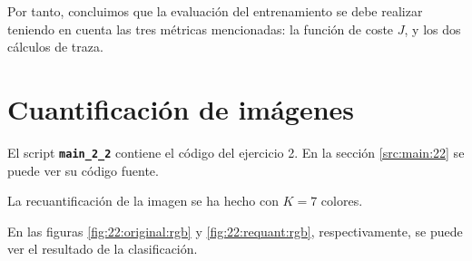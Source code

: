 \documentclass[11pt]{article} %
\begin{document}
Por tanto, concluimos que la evaluación del entrenamiento se debe realizar
teniendo en cuenta las tres métricas mencionadas: la función de coste $J$, y los
dos cálculos de traza.



\clearpage

\section{Cuantificación de imágenes}

El script \textbf{\texttt{main\_2\_2}} contiene el código del ejercicio 2. En la
sección \ref{src:main:22} se puede ver su código fuente.

La recuantificación de la imagen se ha hecho con $K=7$ colores.

En las figuras \ref{fig:22:original:rgb} y \ref{fig:22:requant:rgb},
respectivamente, se puede ver el resultado de la clasificación.
\end{document}

